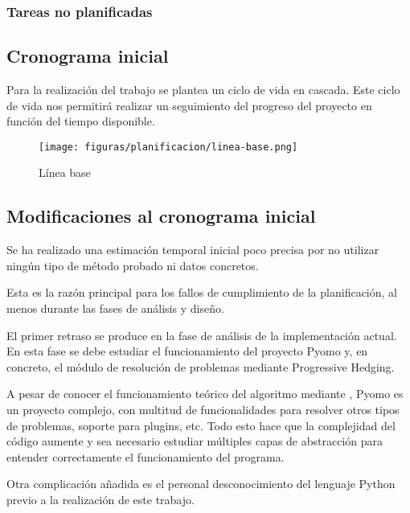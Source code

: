 
\subsubsection{Tareas no planificadas}



\subsection{Cronograma inicial}

Para la realización del trabajo se plantea un ciclo de vida en cascada. Este ciclo de vida nos permitirá realizar un seguimiento del progreso del proyecto en función del tiempo disponible.

\begin{figure}[H]
    \centerline{\texttt{[image: figuras/planificacion/linea-base.png]}}
    \caption{Línea base}
\end{figure}

\subsection{Modificaciones al cronograma inicial}

Se ha realizado una estimación temporal inicial poco precisa por no utilizar ningún tipo de método probado ni datos concretos.

Esta es la razón principal para los fallos de cumplimiento de la planificación, al menos durante las fases de análisis y diseño.

El primer retraso se produce en la fase de análisis de la implementación actual. En esta fase se debe estudiar el funcionamiento del proyecto Pyomo y, en concreto, el módulo de resolución de problemas mediante Progressive Hedging. 

A pesar de conocer el funcionamiento teórico del algoritmo mediante \cite{}, Pyomo es un proyecto complejo, con multitud de funcionalidades para resolver otros tipos de problemas, soporte para plugins, etc. Todo esto hace que la complejidad del código aumente y sea necesario estudiar múltiples capas de abstracción para entender correctamente el funcionamiento del programa.

Otra complicación añadida es el personal desconocimiento del lenguaje Python previo a la realización de este trabajo.\\

